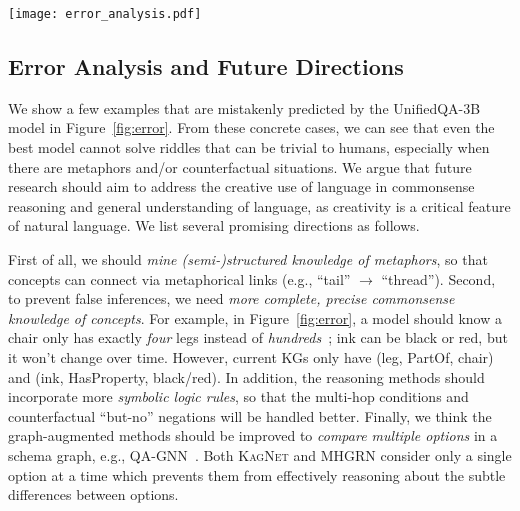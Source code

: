 \begin{figure*}[th!]
	\centering
	\texttt{[image: error\_analysis.pdf]}
	\caption{Case studies of the error by UnifiedQA-3B model on the test set of \textsc{RiddleSense}.}
	\label{fig:error} 
\end{figure*}

\subsection{Error Analysis and Future Directions}
\label{sec:error}
We show a few examples that are mistakenly predicted by the UnifiedQA-3B model in Figure~\ref{fig:error}.
From these concrete cases, 
we can see that even the best model cannot solve riddles that can be trivial to humans, especially when there are metaphors and/or counterfactual situations. 
We argue that future research should aim to address the creative use of language in commonsense reasoning and general understanding of language, 
as creativity is a critical feature of natural language.
We list several promising directions as follows.

First of all, we should \textit{mine (semi-)structured knowledge of metaphors}, so that concepts can connect via metaphorical links (e.g., ``tail'' $\rightarrow$ ``thread'').
Second, to prevent false inferences, we need \textit{more complete, precise commonsense knowledge of concepts}. For example, in Figure~\ref{fig:error}, a model should know a chair only has exactly \textit{four} legs instead of \textit{hundreds}~\cite{lin2020birds}; ink can be black or red, but it won’t change over time. However, current KGs only have (leg, PartOf, chair) and (ink, HasProperty, black/red). 
In addition, the reasoning methods should incorporate more \textit{symbolic logic rules}, so that the multi-hop conditions and counterfactual ``but-no'' negations will be handled better. 
Finally, we think the graph-augmented methods should be improved to \textit{compare multiple options} in a schema graph, e.g., \textsc{QA-GNN}~\cite{yasunaga2021qagnn}.  
Both \textsc{KagNet} and \textsc{MHGRN} consider only a single option at a time which prevents them from effectively reasoning about the subtle differences between options.
